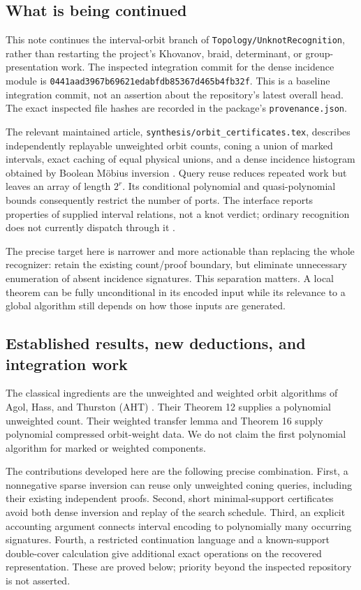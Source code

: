 \documentclass[11pt]{article}
\theoremstyle{definition}
\begin{document}
\subsection{What is being continued}
This note continues the interval-orbit branch of
\texttt{Topology/UnknotRecognition}, rather than restarting the project's
Khovanov, braid, determinant, or group-presentation work. The inspected
integration commit for the dense incidence module is
\texttt{0441aad3967b69621edabfdb85367d465b4fb32f}.
This is a baseline integration commit, not an assertion about the repository's
latest overall head. The exact inspected file hashes are recorded in the
package's \texttt{provenance.json}.

The relevant maintained article, \texttt{synthesis/orbit\_certificates.tex},
describes independently replayable unweighted orbit counts, coning a union of
marked intervals, exact caching of equal physical unions, and a dense
incidence histogram obtained by Boolean M\"obius inversion
\cite{repo-incidence,repo-article}. Query reuse reduces repeated work but
leaves an array of length $2^r$. Its conditional polynomial and
quasi-polynomial bounds consequently restrict the number of ports. The
interface reports properties of supplied interval relations, not a knot
verdict; ordinary recognition does not currently dispatch through it
\cite{repo-article}.

The precise target here is narrower and more actionable than replacing the
whole recognizer: retain the existing count/proof boundary, but eliminate
unnecessary enumeration of absent incidence signatures. This separation
matters. A local theorem can be fully unconditional in its encoded input
while its relevance to a global algorithm still depends on how those inputs
are generated.

\subsection{Established results, new deductions, and integration work}
The classical ingredients are the unweighted and weighted orbit algorithms
of Agol, Hass, and Thurston (AHT) \cite{aht}. Their Theorem 12 supplies a
polynomial unweighted count. Their weighted transfer lemma and Theorem 16
supply polynomial compressed orbit-weight data. We do not claim the first
polynomial algorithm for marked or weighted components.

The contributions developed here are the following precise combination.
First, a nonnegative sparse inversion can reuse only unweighted coning
queries, including their existing independent proofs. Second, short
minimal-support certificates avoid both dense inversion and replay of the
search schedule. Third, an explicit accounting argument connects interval
encoding to polynomially many occurring signatures. Fourth, a restricted
continuation language and a known-support double-cover calculation give
additional exact operations on the recovered representation. These are
proved below; priority beyond the inspected repository is not asserted.
\end{document}
